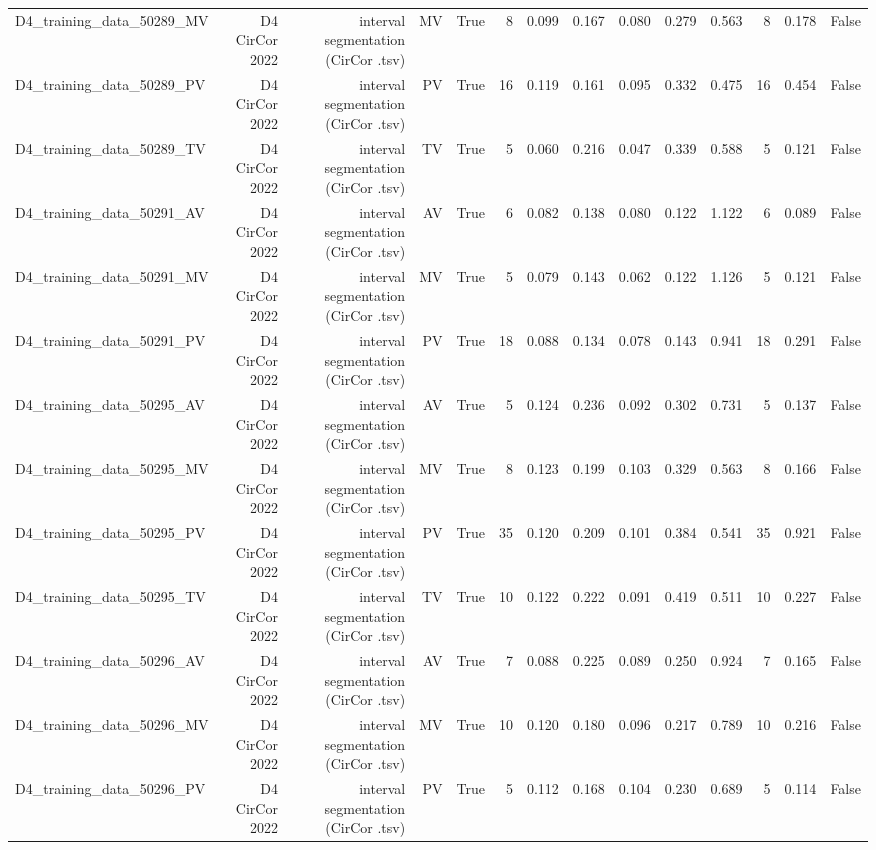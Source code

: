 \begin{table}[htbp]
\begin{tabular}{lrrrrrrrrrrrrr}
    D4\_training\_data\_50289\_MV & D4 CirCor 2022 & interval segmentation (CirCor .tsv) & MV & True & 8 & 0.099 & 0.167 & 0.080 & 0.279 & 0.563 & 8 & 0.178 & False \\
    D4\_training\_data\_50289\_PV & D4 CirCor 2022 & interval segmentation (CirCor .tsv) & PV & True & 16 & 0.119 & 0.161 & 0.095 & 0.332 & 0.475 & 16 & 0.454 & False \\
    D4\_training\_data\_50289\_TV & D4 CirCor 2022 & interval segmentation (CirCor .tsv) & TV & True & 5 & 0.060 & 0.216 & 0.047 & 0.339 & 0.588 & 5 & 0.121 & False \\
    D4\_training\_data\_50291\_AV & D4 CirCor 2022 & interval segmentation (CirCor .tsv) & AV & True & 6 & 0.082 & 0.138 & 0.080 & 0.122 & 1.122 & 6 & 0.089 & False \\
    D4\_training\_data\_50291\_MV & D4 CirCor 2022 & interval segmentation (CirCor .tsv) & MV & True & 5 & 0.079 & 0.143 & 0.062 & 0.122 & 1.126 & 5 & 0.121 & False \\
    D4\_training\_data\_50291\_PV & D4 CirCor 2022 & interval segmentation (CirCor .tsv) & PV & True & 18 & 0.088 & 0.134 & 0.078 & 0.143 & 0.941 & 18 & 0.291 & False \\
    D4\_training\_data\_50295\_AV & D4 CirCor 2022 & interval segmentation (CirCor .tsv) & AV & True & 5 & 0.124 & 0.236 & 0.092 & 0.302 & 0.731 & 5 & 0.137 & False \\
    D4\_training\_data\_50295\_MV & D4 CirCor 2022 & interval segmentation (CirCor .tsv) & MV & True & 8 & 0.123 & 0.199 & 0.103 & 0.329 & 0.563 & 8 & 0.166 & False \\
    D4\_training\_data\_50295\_PV & D4 CirCor 2022 & interval segmentation (CirCor .tsv) & PV & True & 35 & 0.120 & 0.209 & 0.101 & 0.384 & 0.541 & 35 & 0.921 & False \\
    D4\_training\_data\_50295\_TV & D4 CirCor 2022 & interval segmentation (CirCor .tsv) & TV & True & 10 & 0.122 & 0.222 & 0.091 & 0.419 & 0.511 & 10 & 0.227 & False \\
    D4\_training\_data\_50296\_AV & D4 CirCor 2022 & interval segmentation (CirCor .tsv) & AV & True & 7 & 0.088 & 0.225 & 0.089 & 0.250 & 0.924 & 7 & 0.165 & False \\
    D4\_training\_data\_50296\_MV & D4 CirCor 2022 & interval segmentation (CirCor .tsv) & MV & True & 10 & 0.120 & 0.180 & 0.096 & 0.217 & 0.789 & 10 & 0.216 & False \\
    D4\_training\_data\_50296\_PV & D4 CirCor 2022 & interval segmentation (CirCor .tsv) & PV & True & 5 & 0.112 & 0.168 & 0.104 & 0.230 & 0.689 & 5 & 0.114 & False \\

\end{tabular}
\end{table}
